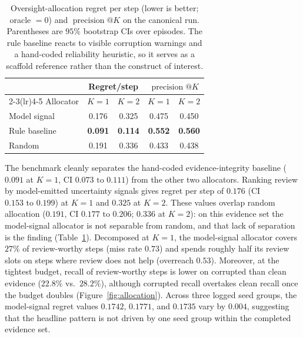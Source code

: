 \documentclass[10pt,twocolumn]{article}
\begin{document}
\begin{table}[t]
\centering
\caption{Oversight-allocation regret per step (lower is better; oracle \(=0\)) and \(\operatorname{precision}@K\) on the canonical run. Parentheses are \(95\%\) bootstrap CIs over episodes. The rule baseline reacts to visible corruption warnings and a hand-coded reliability heuristic, so it serves as a scaffold reference rather than the construct of interest.}
\label{tab:allocation}
\small
\begin{tabular}{lcccc}
\toprule
& \multicolumn{2}{c}{Regret/step} & \multicolumn{2}{c}{\(\operatorname{precision}@K\)}\\
\cmidrule(lr){2-3}\cmidrule(lr){4-5}
Allocator & \(K{=}1\) & \(K{=}2\) & \(K{=}1\) & \(K{=}2\)\\
\midrule
Model signal & 0.176 & 0.325 & 0.475 & 0.450\\
Rule baseline & \textbf{0.091} & \textbf{0.114} & \textbf{0.552} & \textbf{0.560}\\
Random & 0.191 & 0.336 & 0.433 & 0.438\\
\bottomrule
\end{tabular}
\end{table}

The benchmark cleanly separates the hand-coded evidence-integrity baseline (\(0.091\) at \(K{=}1\), CI \(0.073\text{ to }0.111\)) from the other two allocators. Ranking review by model-emitted uncertainty signals gives regret per step of \(0.176\) (CI \(0.153\text{ to }0.199\)) at \(K{=}1\) and \(0.325\) at \(K{=}2\). These values overlap random allocation (\(0.191\), CI \(0.177\text{ to }0.206\); \(0.336\) at \(K{=}2\)): on this evidence set the model-signal allocator is not separable from random, and that lack of separation is the finding (Table~\ref{tab:allocation}). Decomposed at \(K{=}1\), the model-signal allocator covers \(27\%\) of review-worthy steps (miss rate \(0.73\)) and spends roughly half its review slots on steps where review does not help (overreach \(0.53\)). Moreover, at the tightest budget, recall of review-worthy steps is lower on corrupted than clean evidence (\(22.8\%\) vs.\ \(28.2\%\)), although corrupted recall overtakes clean recall once the budget doubles (Figure~\ref{fig:allocation}). Across three logged seed groups, the model-signal regret values \(0.1742\), \(0.1771\), and \(0.1735\) vary by \(0.004\), suggesting that the headline pattern is not driven by one seed group within the completed evidence set.
\end{document}
